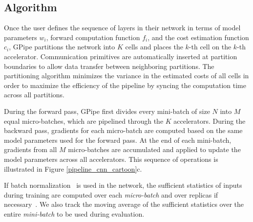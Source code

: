 \documentclass{article}
\def\codename{GPipe}
\begin{document}
\subsection{Algorithm}
Once the user defines the sequence of layers in their network in terms of model parameters $w_i$, forward computation function $f_i$, and the cost estimation function $c_i$, \codename{}  partitions the network into $K$ cells and places the $k$-th cell on the $k$-th accelerator. Communication primitives are automatically inserted at partition boundaries to allow data transfer between neighboring partitions. The partitioning algorithm minimizes the variance in the estimated costs of all cells in order to maximize the efficiency of the pipeline by syncing the computation time across all partitions.

During the forward pass, \codename{} first divides every mini-batch of size $N$ into $M$ equal micro-batches, which are pipelined through the $K$ accelerators. During the backward pass, gradients for each micro-batch are computed based on the same model parameters used for the forward pass. At the end of each mini-batch, gradients from all $M$ micro-batches are accumulated and applied to update the model parameters across all accelerators. This sequence of operations is illustrated in Figure \ref{pipeline_cnn_cartoon}c.

If batch normalization~\cite{ioffe2015batch} is used in the network, the sufficient statistics of inputs during training are computed over each \textit{micro-batch} and over replicas if necessary~\cite{peng2017megdet}. We also track the moving average of the sufficient statistics over the entire \textit{mini-batch} to be used during evaluation.
\end{document}
